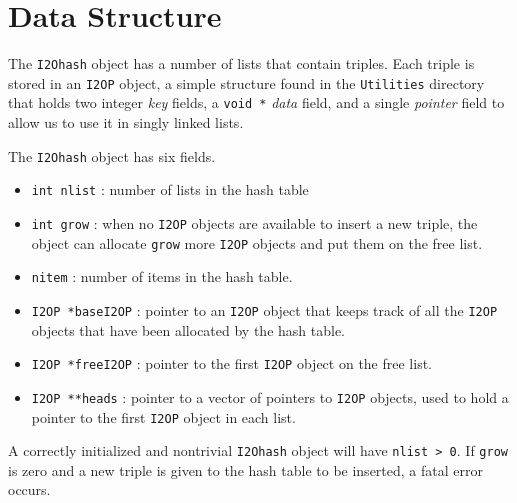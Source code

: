 \par
\section{Data Structure}
\label{section:I2Ohash:dataStructure}
\par
The {\tt I2Ohash} object has a number of lists 
that contain {\tt <key1,key2,value>} triples.
Each 
triple is stored in an {\tt I2OP} object,
a simple structure found in the {\tt Utilities} directory
that holds two integer {\it key} fields, 
a {\tt void *} {\it data} field,
and a single {\it pointer} field to allow us 
to use it in singly linked lists.
\par
The {\tt I2Ohash} object has six fields.
\begin{itemize}
\item 
{\tt int nlist} : number of lists in the hash table
\item 
{\tt int grow} : when no {\tt I2OP} objects are available 
to insert a new {\tt <key1,key2,value>} triple,
the object can allocate {\tt grow} more {\tt I2OP} objects
and put them on the free list.
\item
{\tt nitem} : number of items in the hash table.
\item 
{\tt I2OP *baseI2OP} : 
pointer to an {\tt I2OP} object that keeps track of all 
the {\tt I2OP} objects that have been allocated by the hash table.
\item
{\tt I2OP *freeI2OP} :
pointer to the first {\tt I2OP} object on the free list.
\item
{\tt I2OP **heads} :
pointer to a vector of pointers to {\tt I2OP} objects,
used to hold a pointer to the first {\tt I2OP} object in each list.
\end{itemize}
\par
A correctly initialized and nontrivial {\tt I2Ohash} object 
will have {\tt nlist > 0}.
If {\tt grow} is zero and a new {\tt <key1,key2,value>} triple 
is given to the hash table to be inserted, a fatal error occurs.
